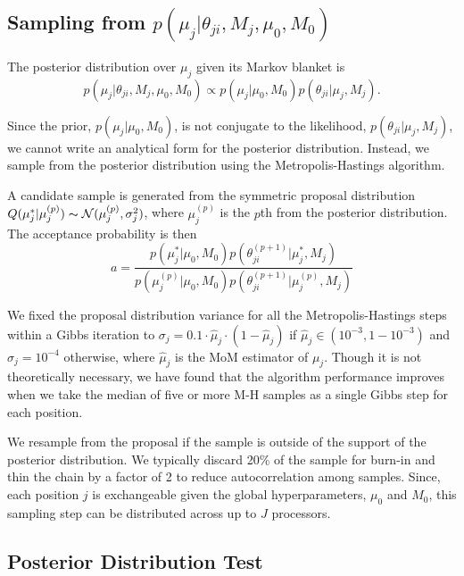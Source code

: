 \documentclass{bioinfo}
\begin{document}
\subsection{Sampling from $p \left( \mu_j |\theta_{ji},M_j,\mu_0,M_0\right)$}
The posterior distribution over $\mu_j$ given its Markov blanket is
\begin{equation}
	p( \mu_j | \theta_{ji}, M_j, \mu_0, M_0 ) \propto p(\mu_j | \mu_0, M_0) p(\theta_{ji} | \mu_j, M_j).
\end{equation}

Since the prior, $p(\mu_j | \mu_0, M_0)$, is not conjugate to the likelihood, $p(\theta_{ji} | \mu_j, M_j)$, we cannot write an analytical form for the posterior distribution. Instead, we sample from the posterior distribution using the Metropolis-Hastings algorithm.

A candidate sample is generated from the symmetric proposal distribution $Q(\mu_j^* | \mu_j^{(p)}) \thicksim \mathcal{N}(\mu_j^{(p)}, \sigma_j^2)$, where $\mu_j^{(p)}$ is the $p$th from the posterior distribution. The acceptance probability is then
\begin{equation}
	a = \frac{ p(\mu_j^* | \mu_0, M_0) p(\theta^{(p+1)}_{ji} | \mu_j^*, M_j) } {p(\mu_j^{(p)} | \mu_0, M_0) p(\theta^{(p+1)}_{ji} | \mu_j^{(p)}, M_j)}
\end{equation}

We fixed the proposal distribution variance for all the Metropolis-Hastings steps within a Gibbs iteration to $\sigma_j = 0.1 \cdot \hat{\mu}_j\cdot (1-\hat{\mu}_j)$ if $\hat{\mu}_j \in (10^{-3},1-10^{-3})$ and $\sigma_j = 10^{-4}$ otherwise, where $\hat{\mu}_j$ is the MoM estimator of $\mu_j$. Though it is not theoretically necessary, we have found that the algorithm performance improves when we take the median of five or more M-H samples as a single Gibbs step for each position.


We resample from the proposal if the sample is outside of the support of the posterior distribution. We typically discard 20\% of the sample for burn-in and thin the chain by a factor of 2 to reduce autocorrelation among samples. Since, each position $j$ is exchangeable given the global hyperparameters, $\mu_0$ and $M_0$, this sampling step can be distributed across up to $J$ processors.

\subsection{Posterior Distribution Test}\label{sec:hypothesis_test}
\end{document}
